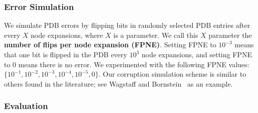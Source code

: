 \documentclass[letterpaper]{article}
\begin{document}

\subsubsection{Error Simulation}


We simulate PDB errors by flipping bits in randomly selected PDB entries after every $X$ node expansions, where $X$ is a parameter. We call this $X$ parameter the \textbf{number of flips per node expansion (FPNE)}. Setting FPNE to $10^{-3}$ means that one bit is flipped in the PDB every $10^{3}$ node expansions, and setting FPNE to $0$ means there is no error. We experimented with the following FPNE values: $\{10^{-1},10^{-2}, 10^{-3}, 10^{-4}, 10^{-5}, 0\}$. Our corruption simulation scheme is similar to others found in the literature; see Wagstaff and Bornstein~ as an example.




\subsubsection{Evaluation}
\end{document}
